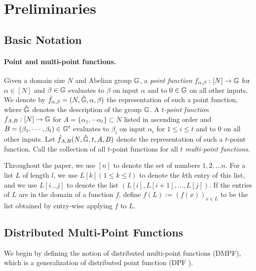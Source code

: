 \section{Preliminaries}
\subsection{Basic Notation}
\paragraph{Point and multi-point functions.} Given a domain size $N$ and Abelian group $\mathbb{G}$, a \emph{point function} $f_{\alpha,\beta}:[N]\rightarrow\mathbb{G}$ for $\alpha\in[N]$ and $\beta\in\mathbb{G}$ evaluates to $\beta$ on input $\alpha$ and to $0\in\mathbb{G}$ on all other inputs. We denote by $\hat{f}_{\alpha,\beta}=(N,\hat{\mathbb{G}},\alpha,\beta)$ the representation of such a point function, where $\hat{\mathbb{G}}$ denotes the description of the group $\mathbb{G}$. A \emph{$t$-point function} $f_{A,B}:[N]\rightarrow \mathbb{G}$ for $A=\{\alpha_1,\cdots\alpha_t\}\subset N$ listed in ascending order and $B=(\beta_1,\cdots,\beta_t)\in \mathbb{G}^t$ evaluates to $\beta_i$ on input $\alpha_i$ for $1\le i\le t$ and to $0$ on all other inputs. Let $\hat{f}_{A,B}(N,\hat{\mathbb{G}},t,A,B)$ denote the representation of such a $t$-point function. Call the collection of all $t$-point functions for all $t$ \emph{multi-point functions}. 

Throughout the paper, we use $[n]$ to denote the set of numbers $1,2,\dots n$. For a list $L$ of length $l$, we use $L[k] (1\le k\le l)$ to denote the $k$th entry of this list, and we use $L[i\dots j]$ to denote the list $(L[i],L[i+1],\dots,L[j])$. If the entries of $L$ are in the domain of a function $f$, define $f(L) := (f(x))_{x\in L}$ to be the list obtained by entry-wise applying $f$ to $L$. 
\subsection{Distributed Multi-Point Functions}

We begin by defining the notion of distributed multi-point functions (DMPF), which is a generalization of distributed point function (DPF \cite{10.1007/978-3-662-46803-6_12,CCS:BoyGilIsh16}). %

